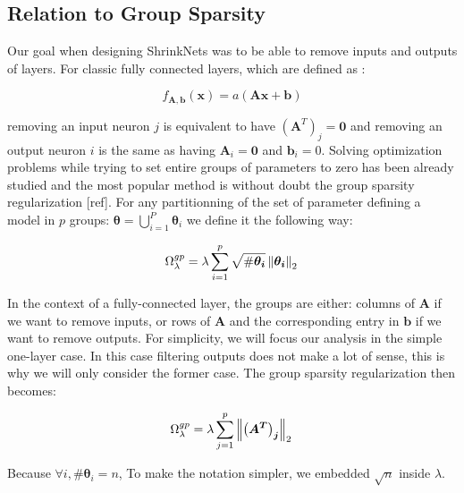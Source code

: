 \subsection{Relation to Group Sparsity}


Our goal when designing ShrinkNets was to be able to remove inputs
and outputs of layers. For classic fully connected layers, which are defined
as :

\begin{equation} \label{fully_connected}
  f_{\bm{A}, \bm{b}}(\bm{x})=a(\bm{Ax + b})
\end{equation}

removing an input neuron $j$ is equivalent to have $\left(\bm{A}^T\right)_j = \bm{0}$
and removing an output neuron $i$ is the same as having $\bm{A}_i = \bm{0}$ and $\bm{b}_i = 0$. Solving  optimization problems while trying to set entire groups
of parameters to zero has been already studied and the most popular method
is without doubt the group sparsity regularization [ref]. For any partitionning of the set of parameter defining a model in $p$ groups: $\bm{\theta} = \bigcup_{i=1}^P \bm{\theta}_i$ we define it the following way:

\begin{equation}
  \Omega_\lambda^{gp} = \lambda \sum_{i=1}^p \sqrt{\#\bm{\theta_i}} \left\lVert\bm{\theta_i}\right\rVert_2 \\
\end{equation}

In the context of a fully-connected layer, the groups are either: columns of $\bm{A}$ if we want to remove inputs, or rows of $\bm{A}$ and the corresponding entry in $\bm{b}$ if we want to remove outputs. For simplicity, we will focus our analysis in the simple one-layer case. In this case filtering outputs does not make a lot of sense, this is why we will only consider the former case. The group sparsity regularization then becomes:


\begin{equation} \label{group_sparsity_regularization}
  \Omega_\lambda^{gp} = \lambda \sum_{j=1}^p \left\lVert\bm{\left(A^T\right)_j}\right\rVert_2 \\
\end{equation}

Because $\forall i, \#\bm{\theta}_i = n$, To make the notation simpler,
we embedded $\sqrt{n}$ inside $\lambda$.

